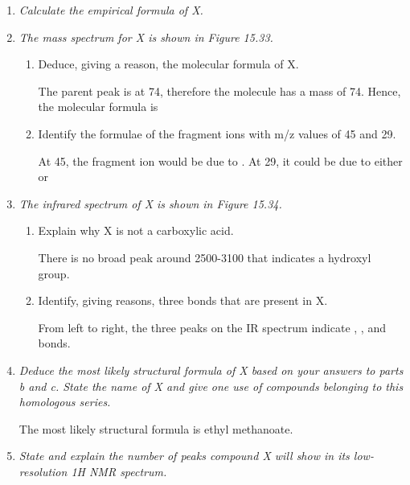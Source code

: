 \documentclass{report}
\begin{document}
\begin{enumerate}
			\begin{enumerate}
				\item \textit{Calculate the empirical formula of X.}


				\item \textit{The mass spectrum for X is shown in Figure 15.33.}

					\begin{enumerate}
						\item Deduce, giving a reason, the molecular formula of X.

							The parent peak is at 74, therefore the molecule has a mass of 74. Hence, the molecular formula is 

						\item Identify the formulae of the fragment ions with m/z values of 45 and 29.

							At 45, the fragment ion would be due to . At 29, it could be due to either  or 
					\end{enumerate}

				\item \textit{The infrared spectrum of X is shown in Figure 15.34.}

					\begin{enumerate}
						\item Explain why X is not a carboxylic acid.

							There is no broad peak around 2500-3100 that indicates a hydroxyl group.

						\item Identify, giving reasons, three bonds that are present in X.

							From left to right, the three peaks on the IR spectrum indicate , , and  bonds.
					\end{enumerate}

				\item \textit{Deduce the most likely structural formula of X based on your answers to parts b and c. State the name of X and give one use of compounds belonging to this homologous series.}

					The most likely structural formula is ethyl methanoate.

					\begin{center}
					\end{center}

				\item \textit{State and explain the number of peaks compound X will show in its low-resolution 1H NMR spectrum.}


\end{enumerate}
\end{enumerate}
\end{document}
